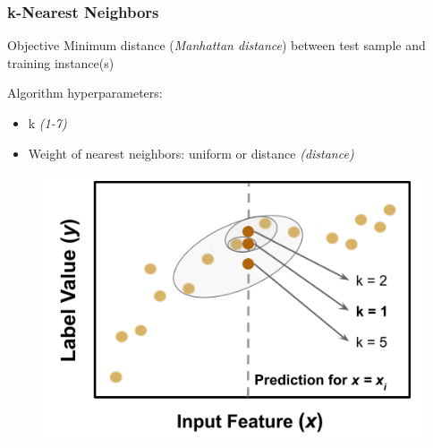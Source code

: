 \begin{frame}
  \frametitle{k-Nearest Neighbors}
  \begin{adjustwidth}{-10pt}{0pt}
  \begin{minipage}{0.5\textwidth}
    \begin{block}{Objective}
      Minimum distance (\textit{Manhattan distance}) between test sample and 
      training instance(s)
    \end{block}
    \begin{block}{Algorithm hyperparameters:}
      \begin{itemize}
        \item k \textit{(1-7)}
        \item Weight of nearest neighbors: uniform or distance \textit{(distance)}
      \end{itemize}
    \end{block}
  \end{minipage}
  \hfill
  \begin{minipage}{0.5\textwidth}
    \begin{figure}
      \centering
      \includegraphics[height=0.5\textheight]{./figures/nn-fig.png}
    \end{figure}
  \end{minipage}
  \end{adjustwidth}
\end{frame}

